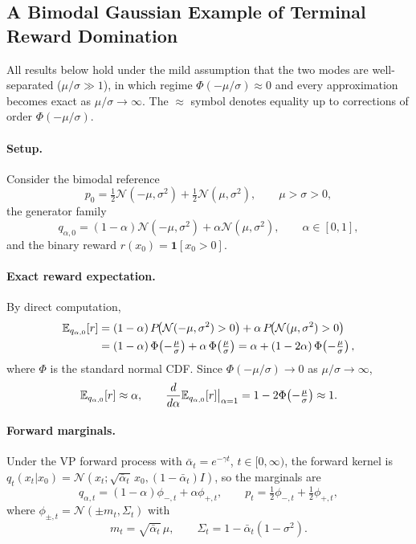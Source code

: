 \subsection{A Bimodal Gaussian Example of Terminal Reward Domination}
\label{app:reward_domination_gaussian}

All results below hold under the mild assumption that the two modes are well-separated ($\mu/\sigma\gg 1$), in which regime $\Phi(-\mu/\sigma)\approx 0$ and every approximation becomes exact as $\mu/\sigma\to\infty$. The $\approx$ symbol denotes equality up to corrections of order $\Phi(-\mu/\sigma)$.

\paragraph{Setup.}
Consider the bimodal reference
\[
p_0
=
\tfrac12\mathcal N(-\mu,\sigma^2)
+
\tfrac12\mathcal N(\mu,\sigma^2),
\qquad
\mu>\sigma>0,
\]
the generator family
\[
q_{\alpha,0}
=
(1-\alpha)\mathcal N(-\mu,\sigma^2)
+
\alpha\mathcal N(\mu,\sigma^2),
\qquad
\alpha\in[0,1],
\]
and the binary reward $r(x_0)=\mathbf 1[x_0>0]$.

\paragraph{Exact reward expectation.}
By direct computation,
\begin{align}
\mathbb{E}_{q_{\alpha,0}}[r]
&= (1-\alpha)\,P\!\bigl(\mathcal N(-\mu,\sigma^2)>0\bigr)
+\alpha\,P\!\bigl(\mathcal N(\mu,\sigma^2)>0\bigr) \nonumber\\
&= (1-\alpha)\,\Phi\!\left(-\tfrac{\mu}{\sigma}\right)
+\alpha\,\Phi\!\left(\tfrac{\mu}{\sigma}\right)
= \alpha + (1-2\alpha)\,\Phi\!\left(-\tfrac{\mu}{\sigma}\right),
\end{align}
where $\Phi$ is the standard normal CDF. Since $\Phi(-\mu/\sigma)\to 0$ as $\mu/\sigma\to\infty$,
\[
\mathbb{E}_{q_{\alpha,0}}[r] \approx \alpha,
\qquad
\frac{d}{d\alpha}\mathbb{E}_{q_{\alpha,0}}[r]\big|_{\alpha=1} = 1 - 2\Phi\!\left(-\tfrac{\mu}{\sigma}\right) \approx 1.
\]

\paragraph{Forward marginals.}
Under the VP forward process with $\bar\alpha_t=e^{-\gamma t}$, $t\in[0,\infty)$, the forward kernel is $q_t(x_t|x_0)=\mathcal{N}(x_t;\sqrt{\bar\alpha_t}\,x_0,(1-\bar\alpha_t)I)$, so the marginals are
\[
q_{\alpha,t}
=
(1-\alpha)\phi_{-,t}
+
\alpha\phi_{+,t},
\qquad
p_t
=
\tfrac12\phi_{-,t}
+
\tfrac12\phi_{+,t},
\]
where $\phi_{\pm,t}=\mathcal N(\pm m_t,\Sigma_t)$ with
\[
m_t=\sqrt{\bar\alpha_t}\,\mu,
\qquad
\Sigma_t=1-\bar\alpha_t(1-\sigma^2).
\]

